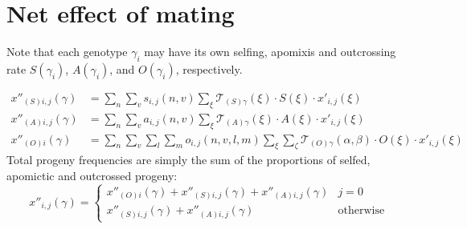 \documentclass[10pt,twoside,a4paper,fleqn]{report}
\numberwithin{equation}{section}  %
\newcommand{\K}{{\bf K}}
\newcommand{\Kcode}[1]{{\tt #1}}
\newcommand{\xpijx}{\mbox{$x'_{i,j}(\xi)$}}
\newcommand{\xppsijg}{\mbox{$x''_{(S)i,j}(\gamma)$}}
\newcommand{\xppaijg}{\mbox{$x''_{(A)i,j}(\gamma)$}}
\newcommand{\xppoig}{\mbox{$x''_{(O)i}(\gamma)$}}
\newcommand{\xppoijg}{\xppoig}
\newcommand{\xppijg}{\mbox{$x''_{i,j}(\gamma)$}}
\newcommand{\funcself}{\mbox{$s_{i,j}(n,v)$}}
\newcommand{\funcapomixis}{\mbox{$a_{i,j}(n,v)$}}
\newcommand{\funcoutcross}{\mbox{$o_{i,j}(n,v,l,m)$}}
\newcommand{\TSgx}{\mbox{$\mathcal{T}_{(S)\gamma}(\xi)$}}
\newcommand{\TAgx}{\mbox{$\mathcal{T}_{(A)\gamma}(\xi)$}}
\newcommand{\TOgab}{\mbox{$\mathcal{T}_{(O)\gamma}(\alpha, \beta)$}}
\begin{document}
{%
\section{Net effect of mating}

Note that each genotype $\gamma_i$ may have its own selfing, apomixis and outcrossing rate $S(\gamma_i)$, $A(\gamma_i)$, and $O(\gamma_i)$, respectively.

\begin{align}
\label{eq:Kreproduction:xppsijg}
\xppsijg &= 
    \sum_{n}{
		\sum_{v}{
		    \funcself \sum_{\xi}{\TSgx \cdot S(\xi) \cdot \xpijx}
		}
	}
\\
\label{eq:Kreproduction:xppaijg}
\xppaijg &= 
    \sum_{n}{
		\sum_{v}{
			\funcapomixis \sum_{\xi}{\TAgx \cdot A(\xi) \cdot \xpijx}
		}
	}
\\
\label{eq:Kreproduction:xppoijg}
\xppoijg &= 
    \sum_{n}{
		\sum_{v}{
			\sum_{l}{
				\sum_{m}{
					\funcoutcross 
					\sum_{\xi}{\sum_{\zeta}{\TOgab \cdot O(\xi) \cdot \xpijx}}
				}
			}
		}
	}
\end{align}
Total progeny frequencies are simply the sum of the proportions of selfed, apomictic and outcrossed progeny:
\begin{equation}
\xppijg = 
\begin{cases}
    \xppoig + \xppsijg + \xppaijg  &  j=0               \\
    \xppsijg + \xppaijg            &  \text{otherwise}
\end{cases}
\end{equation}


}
\end{document}
